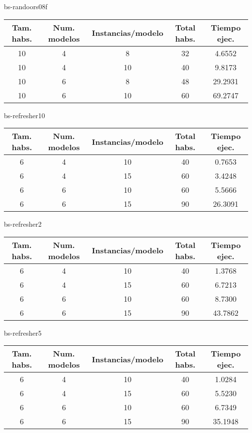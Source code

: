 bs-randoors08f
\begin{center}
	\begin{tabular}{ | c | c | c | c | c | }
\hline
Tam. habs. & Num. modelos & Instancias/modelo & Total habs. & Tiempo ejec. \\ \hline 
10 & 4 & 8 & 32 & 4.6552 \\ 
10 & 4 & 10 & 40 & 9.8173 \\ 
10 & 6 & 8 & 48 & 29.2931 \\ 
10 & 6 & 10 & 60 & 69.2747 \\ 
\hline
	\end{tabular}
\end{center}

bs-refresher10
\begin{center}
	\begin{tabular}{ | c | c | c | c | c | }
\hline
Tam. habs. & Num. modelos & Instancias/modelo & Total habs. & Tiempo ejec. \\ \hline 
6 & 4 & 10 & 40 & 0.7653 \\ 
6 & 4 & 15 & 60 & 3.4248 \\ 
6 & 6 & 10 & 60 & 5.5666 \\ 
6 & 6 & 15 & 90 & 26.3091 \\ 
\hline
	\end{tabular}
\end{center}

bs-refresher2
\begin{center}
	\begin{tabular}{ | c | c | c | c | c | }
\hline
Tam. habs. & Num. modelos & Instancias/modelo & Total habs. & Tiempo ejec. \\ \hline 
6 & 4 & 10 & 40 & 1.3768 \\ 
6 & 4 & 15 & 60 & 6.7213 \\ 
6 & 6 & 10 & 60 & 8.7300 \\ 
6 & 6 & 15 & 90 & 43.7862 \\ 
\hline
	\end{tabular}
\end{center}

bs-refresher5
\begin{center}
	\begin{tabular}{ | c | c | c | c | c | }
\hline
Tam. habs. & Num. modelos & Instancias/modelo & Total habs. & Tiempo ejec. \\ \hline 
6 & 4 & 10 & 40 & 1.0284 \\ 
6 & 4 & 15 & 60 & 5.5230 \\ 
6 & 6 & 10 & 60 & 6.7349 \\ 
6 & 6 & 15 & 90 & 35.1948 \\ 
\hline
	\end{tabular}
\end{center}


